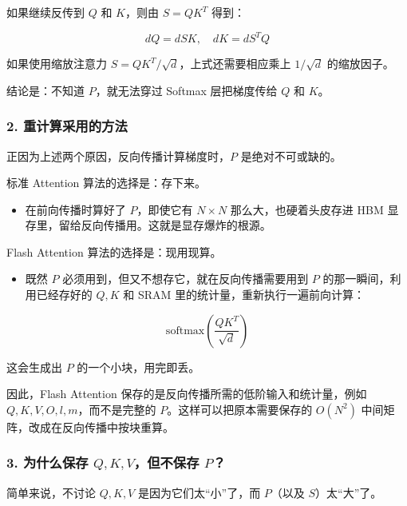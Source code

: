 如果继续反传到 \(Q\) 和 \(K\)，则由 \(S = QK^T\) 得到：

\[
dQ = dS K,\quad dK = dS^T Q
\]

如果使用缩放注意力 \(S = QK^T/\sqrt{d}\)，上式还需要相应乘上 \(1/\sqrt{d}\) 的缩放因子。

结论是：不知道 \(P\)，就无法穿过 Softmax 层把梯度传给 \(Q\) 和 \(K\)。

\hypertarget{ux91cdux8ba1ux7b97ux91c7ux7528ux7684ux65b9ux6cd5}{%
\subsubsection{2. 重计算采用的方法}\label{ux91cdux8ba1ux7b97ux91c7ux7528ux7684ux65b9ux6cd5}}

正因为上述两个原因，反向传播计算梯度时，\(P\) 是绝对不可或缺的。

标准 Attention 算法的选择是：存下来。

\begin{itemize}
\tightlist
\item
  在前向传播时算好了 \(P\)，即使它有 \(N \times N\) 那么大，也硬着头皮存进 HBM 显存里，留给反向传播用。这就是显存爆炸的根源。
\end{itemize}

Flash Attention 算法的选择是：现用现算。

\begin{itemize}
\tightlist
\item
  既然 \(P\) 必须用到，但又不想存它，就在反向传播需要用到 \(P\) 的那一瞬间，利用已经存好的 \(Q,K\) 和 SRAM 里的统计量，重新执行一遍前向计算：
\end{itemize}

\[
\mathrm{softmax}\left(\frac{QK^T}{\sqrt{d}}\right)
\]

这会生成出 \(P\) 的一个小块，用完即丢。

因此，Flash Attention 保存的是反向传播所需的低阶输入和统计量，例如 \(Q,K,V,O,l,m\)，而不是完整的 \(P\)。这样可以把原本需要保存的 \(O(N^2)\) 中间矩阵，改成在反向传播中按块重算。

\hypertarget{ux4e3aux4ec0ux4e48ux4fddux5b58-qkvux4f46ux4e0dux4fddux5b58-p}{%
\subsubsection{\texorpdfstring{3. 为什么保存 \(Q,K,V\)，但不保存 \(P\)？}{3. 为什么保存 Q,K,V，但不保存 P？}}\label{ux4e3aux4ec0ux4e48ux4fddux5b58-qkvux4f46ux4e0dux4fddux5b58-p}}

简单来说，不讨论 \(Q,K,V\) 是因为它们太``小''了，而 \(P\)（以及 \(S\)）太``大''了。

